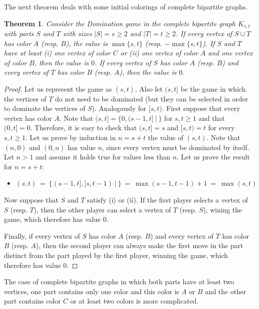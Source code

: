 \documentclass[a4paper,11pt]{article}
\newtheorem{theorem}{Theorem}
\begin{document}
The next theorem deals with some initial colorings of complete bipartite graphs.

\begin{theorem}\label{thm-bip1}
Consider the Domination game in the complete bipartite graph $K_{s,t}$ with parts $S$ and $T$ with sizes $|S|=s\geq 2$ and $|T|=t\geq 2$.
%
If every vertex of $S\cup T$ has color $A$ (resp. $B$), the value is $\max\{s,t\}$ (resp. $-\max\{s,t\}$).
%
If $S$ and $T$ have at least (i) one vertex of color $C$ or (ii) one vertex of color $A$ and one vertex of color $B$, then the value is $0$. If every vertex of $S$ has color $A$ (resp. $B$) and every vertex of $T$ has color $B$ (resp. $A$), then the value is $0$.
\end{theorem}

\begin{proof}
Let us represent the game as $(s,t)$.
Also let $(s,t]$ be the game in which the vertices of $T$ do not need to be dominated (but they can be selected in order to dominate the vertices of $S$). Analogously for $[s,t)$.
First suppose that every vertex has color $A$.
Note that $(s,t]=\{0,(s-1,t]\ |\ \}$ for $s,t\geq 1$ and that $(0,t]=0$. Therefore, it is easy to check that $(s,t]=s$ and $[s,t)=t$ for every $s,t\geq 1$.
Let us prove by induction in $n=s+t$ the value of $(s,t)$. Note that $(n,0)$ and $(0,n)$ has value $n$, since every vertex must be dominated by itself. Let $n>1$ and assume it holds true for values less than $n$. Let us prove the result for $n=s+t$:
\begin{itemize}
\item $(s,t)\ =\ \{(s-1,t],[s,t-1)\ |\ \}\ =\ \max(s-1,t-1)+1\ =\ \max(s,t)$
\end{itemize}

Now suppose that $S$ and $T$ satisfy (i) or (ii).
If the first player selects a vertex of $S$ (resp. $T$), then the other player can select a vertex of $T$ (resp. $S$), wining the game, which therefore has value $0$.

Finally, if every vertex of $S$ has color $A$ (resp. $B$) and every vertex of $T$ has color $B$ (resp. $A$), then the second player can always make the first move in the part distinct from the part played by the first player, winning the game, which therefore has value $0$.
\end{proof}

The case of complete bipartite graphs in which both parts have at least two vertices, one part contains only one color and this color is $A$ or $B$ and the other part contains color $C$ or at least two colors is more complicated.
\end{document}
